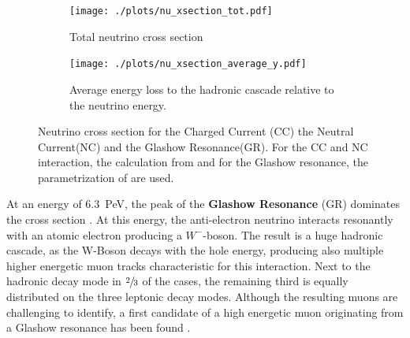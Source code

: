 \begin{figure}
    \centering
    \begin{subfigure}[t]{0.47\textwidth}
        \centering
        \texttt{[image: ./plots/nu\_xsection\_tot.pdf]}
        \caption{Total neutrino cross section}
        \label{fig:nu_xsection_tot}
    \end{subfigure}
    \hfill
    \begin{subfigure}[t]{0.47\textwidth}
        \centering
        \texttt{[image: ./plots/nu\_xsection\_average\_y.pdf]}
        \caption{Average energy loss to the hadronic cascade relative to the neutrino energy.}
        \label{fig:nu_xsection_y}
    \end{subfigure}
    \caption{Neutrino cross section for the Charged Current (CC) the Neutral Current(NC) and the Glashow Resonance(GR). For the CC and NC interaction, the calculation from \cite{CSMS11NuXsection} and for the Glashow resonance, the parametrization of \cite{Barger14} are used.}
    \label{fig:nu_xsection}
\end{figure}

At an energy of \SI{6.3}{PeV}, the peak of the \textbf{Glashow Resonance} (GR) dominates the cross section \cite{Glashow60}.
At this energy, the anti-electron neutrino interacts resonantly with an atomic electron producing a $W^-$-boson.
The result is a huge hadronic cascade, as the W-Boson decays with the hole energy, producing also multiple higher energetic muon tracks characteristic for this interaction.
Next to the hadronic decay mode in $\sfrac23$ of the cases, the remaining third is equally distributed on the three leptonic decay modes.
Although the resulting muons are challenging to identify, a first candidate of a high energetic muon originating from a Glashow resonance has been found \cite{IceCube2016Aachen}.

